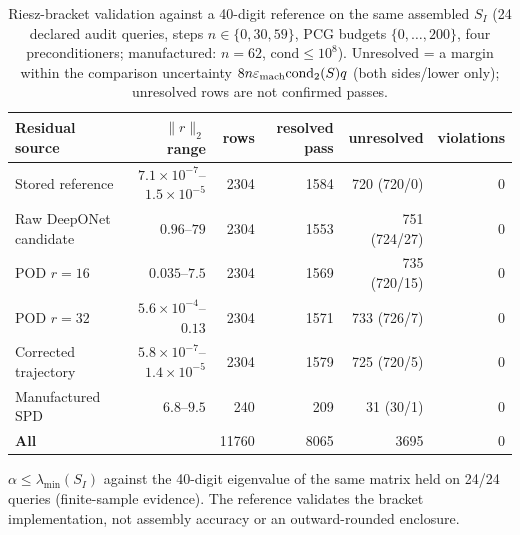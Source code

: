 \begin{table}[!htbp]
\centering\small
\caption{Riesz-bracket validation against a 40-digit reference on the same assembled $S_I$ (24 declared audit queries, steps $n\in\{0,30,59\}$, PCG budgets $\{0,\dots,200\}$, four preconditioners; manufactured: $n=62$, $\mathrm{cond}\le10^8$). Unresolved = a margin within the comparison uncertainty $8n\varepsilon_{\rm mach}\mathrm{cond}_2(S)q$ (both sides/lower only); unresolved rows are not confirmed passes.}
\label{tab:riesz}
\begin{tabular}{lrrrrr}
\toprule
Residual source & $\|r\|_2$ range & rows & resolved pass & unresolved & violations\\
\midrule
Stored reference & $7.1\times10^{-7}$--$1.5\times10^{-5}$ & 2304 & 1584 & 720 (720/0) & 0\\
Raw DeepONet candidate & $0.96$--$79$ & 2304 & 1553 & 751 (724/27) & 0\\
POD $r=16$ & $0.035$--$7.5$ & 2304 & 1569 & 735 (720/15) & 0\\
POD $r=32$ & $5.6\times10^{-4}$--$0.13$ & 2304 & 1571 & 733 (726/7) & 0\\
Corrected trajectory & $5.8\times10^{-7}$--$1.4\times10^{-5}$ & 2304 & 1579 & 725 (720/5) & 0\\
Manufactured SPD & $6.8$--$9.5$ & 240 & 209 & 31 (30/1) & 0\\
\textbf{All} &  & 11760 & 8065 & 3695 & 0\\
\bottomrule
\end{tabular}
\par\smallskip\parbox{0.95\linewidth}{\footnotesize $\alpha\le\lambda_{\min}(S_I)$ against the 40-digit eigenvalue of the same matrix held on 24/24 queries (finite-sample evidence). The reference validates the bracket implementation, not assembly accuracy or an outward-rounded enclosure.}
\end{table}
